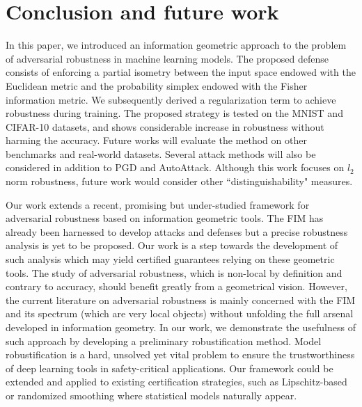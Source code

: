 \documentclass[entropy,article,submit,pdftex,moreauthors]{Definitions/mdpi}
\theoremstyle{plain}
\theoremstyle{definition}
\begin{document}
\section{Conclusion and future work}
\label{seq:conclu}

In this paper, we introduced an information geometric approach to the problem of adversarial robustness in machine learning models. The proposed defense consists of enforcing a partial isometry between the input space endowed with the Euclidean metric and the probability simplex endowed with the Fisher information metric. We subsequently derived a regularization term to achieve robustness during training. The proposed strategy is tested on the MNIST and CIFAR-10 datasets, and shows considerable increase in robustness without harming the accuracy. Future works will evaluate the method on other benchmarks and real-world datasets. Several attack methods will also be considered in addition to PGD and AutoAttack. Although this work focuses on $l_2$ norm robustness, future work would consider other ``distinguishability" measures. 

Our work extends a recent, promising but under-studied framework for adversarial robustness based on information geometric tools. The FIM has already been harnessed to develop attacks \citep{zhaoAdversarialAttackDetection2019} and defenses \citep{picotAdversarialRobustnessFisherRao2022, shenDefendingAdversarialAttacks2019} but a precise robustness analysis is yet to be proposed. Our work is a step towards the development of such analysis which may yield certified guarantees relying on these geometric tools. The study of adversarial robustness, which is non-local by definition and contrary to accuracy, should benefit greatly from a geometrical vision. However, the current literature on adversarial robustness is mainly concerned with the FIM and its spectrum (which are very local objects) without unfolding the full arsenal developed in information geometry. In our work, we demonstrate the usefulness of such approach by developing a preliminary robustification method. Model robustification is a hard, unsolved yet vital problem to ensure the trustworthiness of deep learning tools in safety-critical applications. Our framework could be extended and applied to existing certification strategies, such as Lipschitz-based \citep{leinoGloballyRobustNeuralNetworks2021} or randomized smoothing \citep{cohenCertifiedAdversarialRobustness2019} where statistical models naturally appear.

\end{document}
